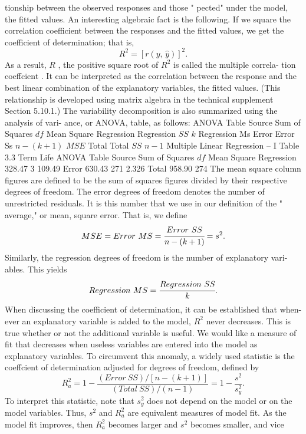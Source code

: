 \documentclass[11pt]{article}
\begin{document}
tionship between the observed responses and those " pected" under the model,
 the fitted values. An interesting algebraic fact is the following. If we square the
correlation coefficient between the responses and the fitted values, we get the
coefficient of determination; that is,
\[
R^{2}=\left[ r \left( y , \, \widehat{y} \right) \right]^{2} .
\]
As a result, \(R\) , the positive square root of \(R^{2}\) is called the multiple correla-
tion coeffcient . It can be interpreted as the correlation between the response
and the best linear combination of the explanatory variables, the fitted values.
(This relationship is developed using matrix algebra in the technical supplement
Section 5.10.1.)
 The variability decomposition is also summarized using the analysis of vari-
ance, or ANOVA, table, as follows:
ANOVA Table
Source Sum of Squares \(d f\) Mean Square
Regression Regression \(\mathit{S S}\) \(k\) Regression Ms
Error Error Ss \(n-( k+1 )\) \(M S E\)
Total Total \(\mathit{S S}\) \(n-1\)
 Multiple Linear Regression -- I
 Table 3.3 Term Life
ANOVA Table Source Sum of Squares \(d f\) Mean Square
Regression 328.47 3 109.49
Error 630.43 271 2.326
Total 958.90 274
The mean square column figures are defined to be the sum of squares figures
divided by their respective degrees of freedom. The error degrees of freedom
denotes the number of unrestricted residuals. It is this number that we use in our
definition of the " average," or mean, square error. That is, we define
\[
M S E=E r r o r \ M S=\cfrac{E r r o r \ S S} {n-( k+1 )}=s^{2} .
\]
 Similarly, the regression degrees of freedom is the number of explanatory vari-
ables. This yields
\[
R e g r e s s i o n \, \, M S=\cfrac{R e g r e s s i o n \, \, S S} {k} .
\]
When discussing the coefficient of determination, it can be established that when-
 ever an explanatory variable is added to the model, \(R^{2}\) never decreases. This is
 true whether or not the additional variable is useful. We would like a measure of
 fit that decreases when useless variables are entered into the model as explanatory
variables. To circumvent this anomaly, a widely used statistic is the coeffcient of
 determination adjusted for degrees of freedom, defined by
\[
R_{a}^{2}=1-\frac{( E r r o r \ S S ) / [ n-( k+1 ) ]} {( T o t a l \ S S ) / ( n-1 )}=1-\frac{s^{2}} {s_{y}^{2}} . \tag{3.9}
\]
To interpret this statistic, note that \(s_{y}^{2}\) does not depend on the model or on the
model variables. Thus, \(s^{2}\) and \(R_{a}^{2}\) are equivalent measures of model fit. As the
model fit improves, then \(R_{a}^{2}\) becomes larger and \(s^{2}\) becomes smaller, and vice
\end{document}

